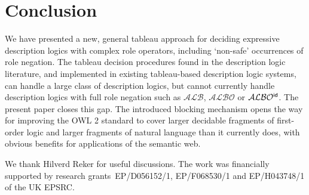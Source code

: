 \documentclass[leqno
,pdflatex
,prodmode
,acmtocl
]{acmsmall}
\newcommand{\mathcmd}[1]{\ensuremath{#1}\xspace}
\newcommand{\dlfont}{\mathcal}
\newcommand{\dl}[1]{\mathcmd{\dlfont{#1}}}
\newcommand{\idRole}{\mathcmd{\textsf{\upshape\mdseries id}}}
\newcommand{\ALBOid}{\dl{ALBO\smash[t]{\mbox{${}^{\idRole}$}}}}
\newcommand{\ALB}{\dl{ALB}}
\newcommand{\ALBO}{\dl{ALBO}}
\begin{document}
\section{Conclusion}

We have presented a new, general tableau approach for deciding
expressive description logics with complex role operators, including 
`non-safe' occurrences of role negation.
The tableau decision procedures found in the description logic
literature, and implemented in existing tableau-based description
logic systems, can handle a large class of description logics, but
cannot currently handle description logics with full role negation
such as \ALB, \ALBO or \ALBOid.
The present paper closes this gap.
The introduced blocking mechanism opens the way for improving the OWL 2 standard
to cover larger decidable fragments of first-order logic and larger fragments of natural language
than it currently does, with obvious benefits for applications of
the semantic web.

\begin{acks}
We thank Hilverd Reker for useful discussions.
The work was financially supported by research grants~EP/D056152/1, EP/F068530/1
and
EP/H043748/1 of the UK EPSRC.
\end{acks}
\end{document}
